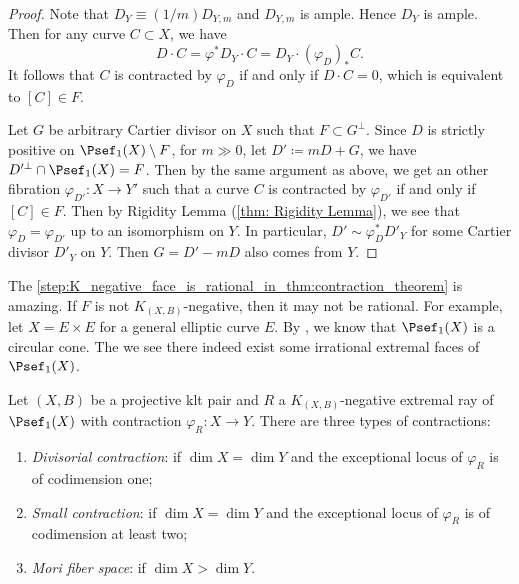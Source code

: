 \begin{proof}
        Note that \(D_Y \equiv (1/m) D_{Y,m}\) and \(D_{Y,m}\) is ample.
        Hence \(D_Y\) is ample.
        Then for any curve \(C \subset X\), we have
        \[ D \cdot C = \varphi^* D_Y \cdot C = D_Y \cdot (\varphi_D)_* C. \]
        It follows that \(C\) is contracted by \(\varphi_D\) if and only if \(D \cdot C = 0\), which is equivalent to \([C] \in F\).
        
        Let \(G\) be arbitrary Cartier divisor on \(X\) such that \(F \subset G^\perp\).
        Since \(D\) is strictly positive on \(\Psef_1(X) \setminus F\), for \(m \gg 0\), let \(D'\coloneqq mD+G\), we have \(D'^\perp \cap \Psef_1(X) = F\).
        Then by the same argument as above, we get an other fibration \(\varphi_{D'}: X \to Y'\) such that a curve \(C\) is contracted by \(\varphi_{D'}\) if and only if \([C] \in F\).
        Then by Rigidity Lemma (\cref{thm: Rigidity Lemma}), we see that \(\varphi_D = \varphi_{D'}\) up to an isomorphism on \(Y\).
        In particular, \(D' \sim \varphi_D^* D'_Y\) for some Cartier divisor \(D'_Y\) on \(Y\).
        Then \(G = D' - mD\) also comes from \(Y\).
    \end{proof}
    \begin{remark}\label{rmk_K_negative_face_is_rational}
        The \cref{step:K_negative_face_is_rational_in_thm:contraction_theorem} is amazing.
        If \(F\) is not \(K_{(X,B)}\)-negative, then it may not be rational.
        For example, let \(X = E \times E\) for a general elliptic curve \(E\).
        By \cite[Lemma 1.5.4]{Laz04a}, we know that \(\Psef_1(X)\) is a circular cone.
        The we see there indeed exist some irrational extremal faces of \(\Psef_1(X)\).
    \end{remark}

    \begin{definition}\label{def:types_of_contractions_in_MMP}
        Let \((X,B)\) be a projective klt pair and \(R\) a \(K_{(X,B)}\)-negative extremal ray of \(\Psef_1(X)\) with contraction \(\varphi_R: X \to Y\).
        There are three types of contractions:
        \begin{enumerate}
            \item \emph{Divisorial contraction}: if \(\dim X = \dim Y\) and the exceptional locus of \(\varphi_R\) is of codimension one;
            \item \emph{Small contraction}: if \(\dim X = \dim Y\) and the exceptional locus of \(\varphi_R\) is of codimension at least two;
            \item \emph{Mori fiber space}: if \(\dim X > \dim Y\).
        \end{enumerate}
    \end{definition}

